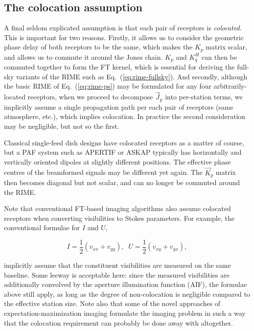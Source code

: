 \documentclass{aa}
\newcommand{\herm}{H}
\newcommand{\jones}[2]{\vec {#1}_{#2}}
\begin{document}
\subsection{The colocation assumption}

A final seldom explicated assumption is that each pair of receptors is \emph{colocated}. This is important for two reasons. Firstly, it allows us to consider the geometric phase delay of both receptors to be the same, which makes the $K_p$ matrix scalar, and allows us to commute it around the Jones chain. $K_p$ and $K_q^\herm$ can then be commuted together to form the FT kernel, which is essential for deriving the full-sky variants of the RIME such as Eq.~(\ref{eq:rime-fullsky}). And secondly, although the basic RIME of Eq.~(\ref{eq:rime-ps}) may be formulated for any four arbitrarily-located receptors, when we proceed to decompose $\jones{J}{p}$ into per-station terms, we implicitly assume a single propagation path per each pair of receptors (same atmosphere, etc.), which implies colocation. In practice the second consideration may be negligible, but not so the first.

Classical single-feed dish designs have colocated receptors as a matter of course, but a PAF system such as APERTIF \citep{Apertif} or ASKAP \citep{ASKAP} typically has horizontally and vertically oriented dipoles at slightly different positions. The effective phase centres of the beamformed signals may be different yet again. The $\jones{K}{p}$ matrix then becomes diagonal but not scalar, and can no longer be commuted around the RIME. 

Note that conventional FT-based imaging algorithms also assume colocated receptors when converting visibilities to Stokes parameters. For example, the conventional formulae for $I$ and $U$,

\[
I=\frac{1}{2}(v_{xx}+v_{yy}),\;\;U=\frac{1}{2}(v_{xy}+v_{yx}),
\] 

implicitly assume that the constituent visibilities are measured on the same baseline. Some leeway is acceptable here: since the measured visibilities are additionally convolved by the aperture illumination function (AIF), the formulae above still apply, as long as the degree of non-colocation is negligible compared to the effective station size. Note also that some of the novel approaches of expectation-maximization imaging \citep{leshem-em,levanda-leshem-em} formulate the imaging problem in such a way that the colocation requirement can probably be done away with altogether.
\end{document}
